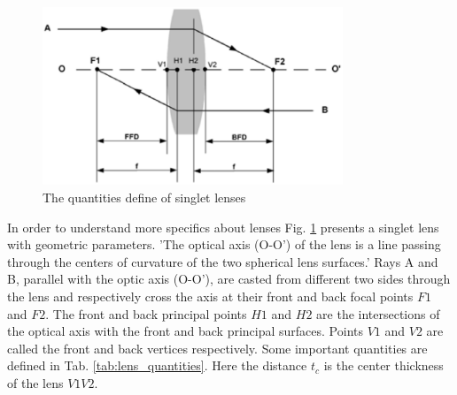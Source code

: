 \begin{figure}[httbp]
\centering
\includegraphics[width=0.8\textwidth]{bilder/lens_define}
\caption{The quantities define of singlet lenses \cite{lens_theory_LC_Ltd}}
\label{fig:lens_define}
\end{figure}
In order to understand more specifics about lenses Fig. \ref{fig:lens_define}  presents a singlet lens with geometric parameters. 'The optical axis (O-O') of the lens is a line passing through the centers of curvature of the two spherical lens surfaces.' 
Rays A and B, parallel with the optic axis (O-O'), are casted from different two sides through the lens and respectively cross the axis at their front and back focal points $F1$ and $F2$. The front and back principal points $H1$ and $H2$ are the intersections of the optical axis with the front and back principal surfaces. Points $V1$ and $V2$ are called the front and back vertices respectively\cite{lens_theory_LC_Ltd}.  Some important quantities are defined in Tab. \ref{tab:lens_quantities}. Here the distance $t_{c}$ is the center thickness of the lens $V1V2$.\\
